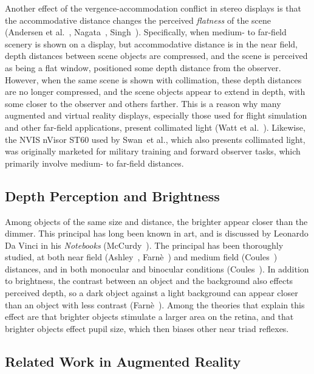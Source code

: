 \documentclass[10pt,journal,compsoc]{IEEEtran}
\makeatletter
\newcommand{\etal}{et al.\@\xspace} %
\makeatother
\begin{document}
Another effect of the vergence-accommodation conflict in stereo displays is that the accommodative distance changes the perceived \emph{flatness} of the scene (Andersen \etal~\cite{andersen:1998}, Nagata~\cite{nagata:1991}, Singh~\cite{singh:2013}).  Specifically, when medium- to far-field scenery is shown on a display, but accommodative distance is in the near field, depth distances between scene objects are compressed, and the scene is perceived as being a flat window, positioned some depth distance from the observer.  However, when the same scene is shown with collimation, these depth distances are no longer compressed, and the scene objects appear to extend in depth, with some closer to the observer and others farther.  This is a reason why many augmented and virtual reality displays, especially those used for flight simulation and other far-field applications, present collimated light (Watt \etal~\cite{watt:2005}).  Likewise, the NVIS nVisor ST60 used by Swan~\etal \cite{swan:2015}, which also presents collimated light, was originally marketed for military training and forward observer tasks, which primarily involve medium- to far-field distances.  

\subsection{Depth Perception and Brightness}
\label{s:bright}

Among objects of the same size and distance, the brighter appear closer than the dimmer.  This principal has long been known in art, and is discussed by Leonardo Da Vinci in his \emph{Notebooks} (McCurdy~\cite{mccurdy:1938}).  The principal has been thoroughly studied, at both near field (Ashley~\cite{ashley:1898}, Farn\`{e}~\cite{farne:1977}) and medium field (Coules~\cite{coules:1955}) distances, and in both monocular and binocular conditions (Coules~\cite{coules:1955}).  In addition to brightness, the contrast between an object and the background also effects perceived depth, so a dark object against a light background can appear closer than an object with less contrast (Farn\`{e}~\cite{farne:1977}).  Among the theories that explain this effect are that brighter objects stimulate a larger area on the retina, and that brighter objects effect pupil size, which then biases other near triad reflexes.  

\subsection{Related Work in Augmented Reality}
\end{document}
